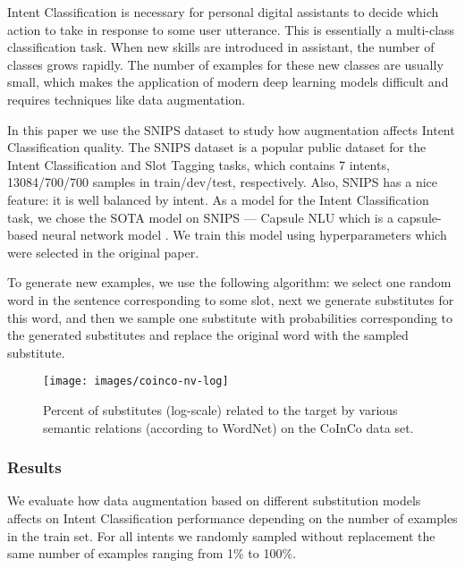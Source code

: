 \documentclass[11pt,a4paper]{article}
\begin{document}
Intent Classification is necessary for personal digital assistants to decide which action to take in response to some user utterance.%
This is essentially a multi-class classification task. When new skills are introduced in assistant, the number of classes grows rapidly. The number of examples for these new classes are usually small, which makes the application of modern deep learning models difficult and requires techniques like data augmentation.

In this paper we use the SNIPS dataset to study how augmentation affects Intent Classification quality. %
The SNIPS dataset \cite{Coucke2018SnipsVP} is a popular public dataset for the Intent Classification and Slot Tagging tasks, which contains 7 intents, 13084/700/700 samples in train/dev/test, respectively. 
Also, SNIPS has a nice feature: it is well balanced by intent.
As a model for the Intent Classification task, we chose the SOTA model on SNIPS --- Capsule NLU which is a capsule-based neural network model \cite{Zhang2018JointSF}. 
We train this model using hyperparameters which were selected in the original paper.

To generate new examples, we use the following algorithm: we select one random word in the sentence corresponding to some slot, next we generate substitutes for this word, and then we sample one substitute with probabilities corresponding to the generated substitutes and replace the original word with the sampled substitute.

\begin{figure}[!h]
\begin{center}

\texttt{[image: images/coinco-nv-log]}

\caption{Percent of substitutes (log-scale) related to the target by various semantic relations (according to WordNet) on the CoInCo data set.}
\label{fig:relation-types}
\end{center}
\end{figure}


\subsubsection{Results}

We evaluate how data augmentation based on different substitution models affects on Intent Classification %
performance depending on the number of examples in the train set.
For all intents we randomly sampled without replacement the same number of examples ranging from 1\% to 100\%.
\end{document}
